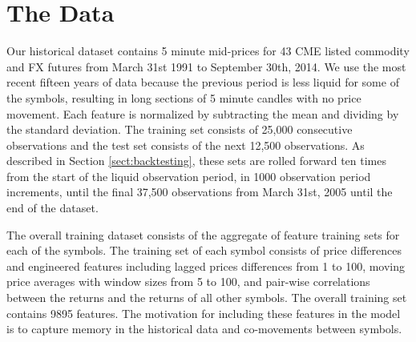 \documentclass{article}
\begin{document}
% 

\section{The Data} \label{sect:data}
Our historical dataset contains 5 minute mid-prices  for 43 CME listed commodity and FX futures from March 31st 1991 to September 30th, 2014.  We use the most recent fifteen years of data because the previous period is less liquid for some of the symbols, resulting in long sections of 5 minute candles with no price movement. Each feature is normalized by subtracting the mean and dividing by the standard deviation. The training set consists of 25,000 consecutive observations and the test set consists of the next 12,500 observations. As described in Section \ref{sect:backtesting}, these sets are rolled forward ten times from the start of the liquid observation period, in 1000 observation period increments, until the final 37,500 observations from March 31st, 2005 until the end of the dataset.

The overall training dataset consists of the aggregate of feature training sets for each of the symbols. The training set of each symbol consists of price differences and engineered features including lagged prices differences from 1 to 100, moving price averages with window sizes from 5 to 100, and pair-wise correlations between the returns and the returns of all other symbols. The overall training set contains 9895 features. The motivation for including these features in the model is to capture memory in the historical data and co-movements between symbols.
\end{document}
